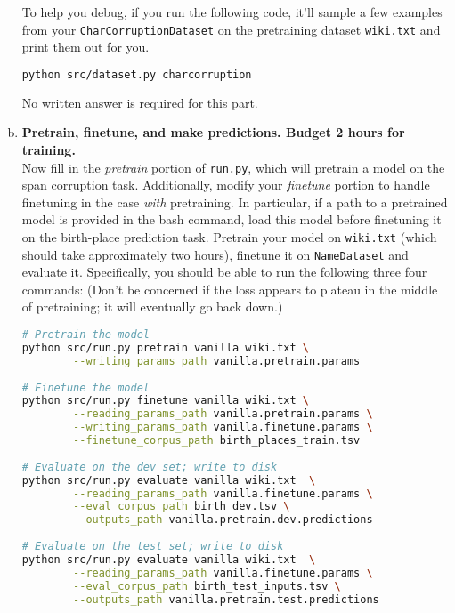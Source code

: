 \begin{enumerate}[(a)]
To help you debug, if you run the following code, it'll sample a few examples from your \texttt{CharCorruptionDataset} on the pretraining dataset \texttt{wiki.txt} and print them out for you.
\begin{lstlisting}[language=bash]
    python src/dataset.py charcorruption
\end{lstlisting}

No written answer is required for this part.

\item {} \textbf{Pretrain, finetune, and make predictions. Budget 2 hours for training.}\\
Now fill in the \textit{pretrain} portion of \texttt{run.py}, which will pretrain a model on the span corruption task. Additionally, modify your \textit{finetune} portion to handle finetuning in the case \textit{with} pretraining. In particular, if a path to a pretrained model is provided in the bash command, load this model before finetuning it on the birth-place prediction task.
Pretrain your model on \texttt{wiki.txt} (which should take approximately two hours), finetune it on \texttt{NameDataset} and evaluate it. Specifically, you should be able to run the following three four commands:
(Don't be concerned if the loss appears to plateau in the middle of pretraining; it will eventually go back down.)
\begin{lstlisting}[language=bash]
# Pretrain the model
python src/run.py pretrain vanilla wiki.txt \
        --writing_params_path vanilla.pretrain.params
        
# Finetune the model
python src/run.py finetune vanilla wiki.txt \
        --reading_params_path vanilla.pretrain.params \
        --writing_params_path vanilla.finetune.params \
        --finetune_corpus_path birth_places_train.tsv
        
# Evaluate on the dev set; write to disk
python src/run.py evaluate vanilla wiki.txt  \
        --reading_params_path vanilla.finetune.params \
        --eval_corpus_path birth_dev.tsv \
        --outputs_path vanilla.pretrain.dev.predictions
        
# Evaluate on the test set; write to disk
python src/run.py evaluate vanilla wiki.txt  \
        --reading_params_path vanilla.finetune.params \
        --eval_corpus_path birth_test_inputs.tsv \
        --outputs_path vanilla.pretrain.test.predictions
\end{lstlisting}


\end{enumerate}
